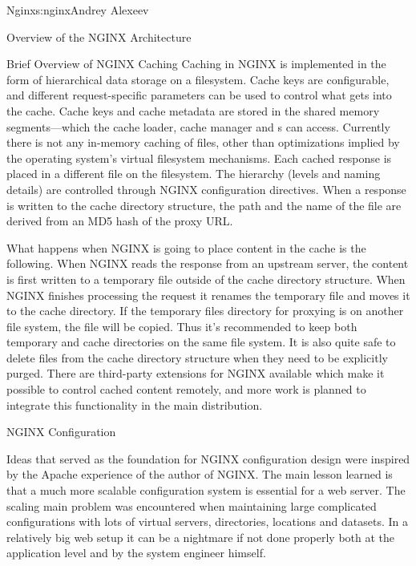 \begin{aosachapter}{Nginx}{s:nginx}{Andrey Alexeev}
\begin{aosasect1}{Overview of the NGINX Architecture}
\begin{aosasect2}{Brief Overview of NGINX Caching}
Caching in NGINX is implemented in the form of hierarchical data
storage on a filesystem. Cache keys are configurable, and different
request-specific parameters can be used to control what gets into the
cache. Cache keys and cache metadata are stored in the shared memory
segments---which the cache loader, cache manager and s
can access. Currently there is not any in-memory caching of files,
other than optimizations implied by the operating system's virtual
filesystem mechanisms. Each cached response is placed in a different
file on the filesystem. The hierarchy (levels and naming details) are
controlled through NGINX configuration directives. When a response is
written to the cache directory structure, the path and the name of the
file are derived from an MD5 hash of the proxy URL.

What happens when NGINX is going to place content in the cache is the
following. When NGINX reads the response from an upstream server, the
content is first written to a temporary file outside of the cache
directory structure. When NGINX finishes processing the request it
renames the temporary file and moves it to the cache directory. If the
temporary files directory for proxying is on another file system, the
file will be copied. Thus it's recommended to keep both temporary and
cache directories on the same file system. It is also quite safe to
delete files from the cache directory structure when they need to be
explicitly purged. There are third-party extensions for NGINX
available which make it possible to control cached content remotely,
and more work is planned to integrate this functionality in the main
distribution.

\end{aosasect2}

\end{aosasect1}

\begin{aosasect1}{NGINX Configuration}

Ideas that served as the foundation for NGINX configuration design
were inspired by the Apache experience of the author of NGINX. The
main lesson learned is that a much more scalable configuration system
is essential for a web server. The scaling main problem was
encountered when maintaining large complicated configurations with
lots of virtual servers, directories, locations and datasets. In a
relatively big web setup it can be a nightmare if not done properly
both at the application level and by the system engineer himself.


\end{aosasect1}
\end{aosachapter}
